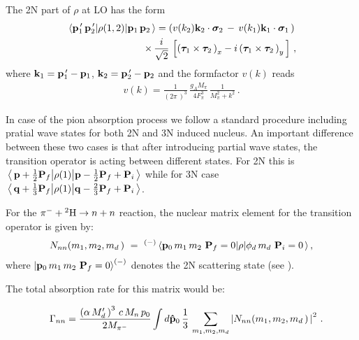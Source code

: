    The 2N part of $ \rho$ at LO has the form \cite{Lensky2006}
    \begin{eqnarray}
    \matrixel{
        {\bf p}_1^{\, \prime}\,
        {\bf p}_2^{\, \prime}
        } 
    {\rho(1,2)}
    {
        {\bf p}_1 \, 
        {\bf p}_2 \, 
        } = 
        \left(
        v( k_2 )  {\bf k}_2 \cdot {\bm \sigma}_2 \, - \, 
        v( k_1 )  {\bf k}_1 \cdot {\bm \sigma}_1 \,
        \right) \, \nonumber \\ \times \,
        \frac{i}{\sqrt{2}} \, 
        \left[ 
            \left( {\bm \tau}_1 \times {\bm \tau}_2 \, \right)_x 
            - i \left( {\bm \tau}_1 \times {\bm \tau}_2 \, \right)_y \,
        \right] \,,
    \label{rho12}
    \end{eqnarray}
    where 
    $ {\bf k}_1 = {\bf p}_1^{\, \prime} - {\bf p}_1 $,
    $ {\bf k}_2 = {\bf p}_2^{\, \prime} - {\bf p}_2 $
    and the formfactor $v(k)$ reads 
    \begin{eqnarray}
    v (k) = \frac 1{ \left( 2 \pi \, \right)^3 } \,
            \frac{g_A M_\pi}{4 F_\pi^3 } \,
        \frac1{M_\pi^2 + k^2 } \, .
    \label{vk}
    \end{eqnarray}

    In case of the pion absorption process we follow a standard procedure
    including pratial wave states for both 2N and 3N induced nucleus.
    An important difference between these two cases is that
    after introducing partial wave states, the transition operator is acting between
    different states. For 2N this is 
    $ \matrixel{\, {\bf p} + \frac12{\bf P}_f } 
    {\rho (1) }{ {\bf p} - \frac12{\bf P}_f + {\bf P}_i \, }$
    while for 3N case
    $\matrixel {\, {\bf q} + \frac13{\bf P}_f}  
    {\rho(1)} {{\bf q} - \frac23{\bf P}_f + {\bf P}_i \,}$.

    For the $\pi^- + {^2{\rm H}} \rightarrow n + n $ reaction,
    the nuclear matrix element for the transition operator is given by:
    \begin{eqnarray}
        N_{nn} (m_1, m_2, m_d \, ) \ = \
   ^{(-)}\matrixel{ {\bf p}_0 \, m_{1} \, m_2 \ {\bf P}_f=0 } 
   {\rho } {\phi_d \, m_d \ {\bf P}_i=0 \, },
   \label{nnn1}
   \end{eqnarray}
   where $ \ket{  {\bf p}_0 \, m_{1} \, m_2 \ {\bf P}_f=0  }^{(-)}  $ denotes the 2N scattering state (see \cite{Golak2018}).

   The total absorption rate for this matrix would be:

   \begin{eqnarray}
        &&\Gamma_{nn} = 
    \frac{ \left( \alpha \, M^\prime_d \, \right)^3 \, c \, M_n \, p_0 }{ 2 M_{\pi^-} }
        \int d {\bf\hat p}_0 \,
        \frac13 \, 
        \sum\limits_{m_1, m_2, m_d} 
        \left| 
        N_{nn} (m_1, m_2, m_d \, ) \, 
        \right|^2  \, .
    \label{gnn1}
    \end{eqnarray} 

